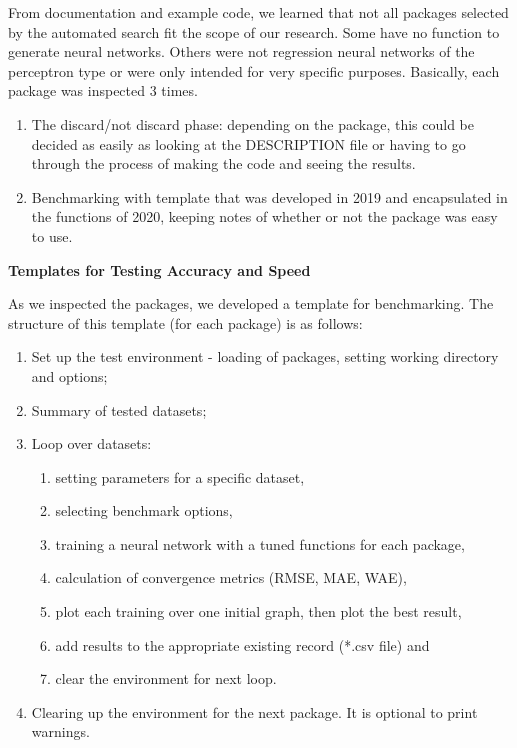 From documentation and example code, we learned that not all packages
selected by the automated search fit the scope of our research. Some
have no function to generate neural networks. Others were not regression
neural networks of the perceptron type or were only intended for very
specific purposes. Basically, each package was inspected 3 times.

\begin{enumerate}
\def\labelenumi{\arabic{enumi}.}
\item
  The discard/not discard phase: depending on the package, this could be
  decided as easily as looking at the DESCRIPTION file or having to go
  through the process of making the code and seeing the results.
\item
  Benchmarking with template that was developed in 2019 and encapsulated
  in the functions of 2020, keeping notes of whether or not the package
  was easy to use.
\end{enumerate}

\textbf{Templates for Testing Accuracy and Speed}

As we inspected the packages, we developed a template for benchmarking.
The structure of this template (for each package) is as follows:

\begin{enumerate}
\def\labelenumi{\arabic{enumi}.}
\tightlist
\item
  Set up the test environment - loading of packages, setting working
  directory and options;
\item
  Summary of tested datasets;
\item
  Loop over datasets:

  \begin{enumerate}
  \def\labelenumii{\alph{enumii}.}
  \tightlist
  \item
    setting parameters for a specific dataset,
  \item
    selecting benchmark options,
  \item
    training a neural network with a tuned functions for each package,
  \item
    calculation of convergence metrics (RMSE, MAE, WAE),
  \item
    plot each training over one initial graph, then plot the best
    result,
  \item
    add results to the appropriate existing record (*.csv file) and
  \item
    clear the environment for next loop.
  \end{enumerate}
\item
  Clearing up the environment for the next package. It is optional to
  print warnings.
\end{enumerate}

